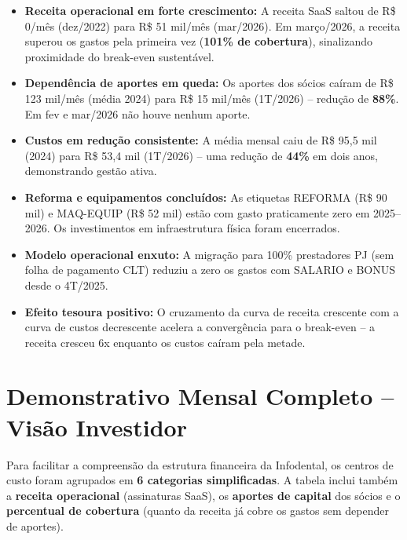 \documentclass[12pt, a4paper]{article}
\begin{document}
\begin{itemize}
    \item \textcolor{successGreen}{\textbf{Receita operacional em forte crescimento:}} A receita SaaS saltou de R\$ 0/mês (dez/2022) para R\$ 51 mil/mês (mar/2026). Em março/2026, a receita superou os gastos pela primeira vez (\textbf{101\% de cobertura}), sinalizando proximidade do break-even sustentável.

    \item \textcolor{successGreen}{\textbf{Dependência de aportes em queda:}} Os aportes dos sócios caíram de R\$ 123 mil/mês (média 2024) para R\$ 15 mil/mês (1T/2026) -- redução de \textbf{88\%}. Em fev e mar/2026 não houve nenhum aporte.

    \item \textcolor{successGreen}{\textbf{Custos em redução consistente:}} A média mensal caiu de R\$ 95,5 mil (2024) para R\$ 53,4 mil (1T/2026) -- uma redução de \textbf{44\%} em dois anos, demonstrando gestão ativa.

    \item \textcolor{successGreen}{\textbf{Reforma e equipamentos concluídos:}} As etiquetas REFORMA (R\$ 90 mil) e MAQ-EQUIP (R\$ 52 mil) estão com gasto praticamente zero em 2025--2026. Os investimentos em infraestrutura física foram encerrados.

    \item \textcolor{successGreen}{\textbf{Modelo operacional enxuto:}} A migração para 100\% prestadores PJ (sem folha de pagamento CLT) reduziu a zero os gastos com SALARIO e BONUS desde o 4T/2025.

    \item \textcolor{successGreen}{\textbf{Efeito tesoura positivo:}} O cruzamento da curva de receita crescente com a curva de custos decrescente acelera a convergência para o break-even -- a receita cresceu 6x enquanto os custos caíram pela metade.
\end{itemize}

\newpage
\section{Demonstrativo Mensal Completo -- Visão Investidor}

Para facilitar a compreensão da estrutura financeira da Infodental, os centros de custo foram agrupados em \textbf{6 categorias simplificadas}. A tabela inclui também a \textbf{receita operacional} (assinaturas SaaS), os \textbf{aportes de capital} dos sócios e o \textbf{percentual de cobertura} (quanto da receita já cobre os gastos sem depender de aportes).
\end{document}
